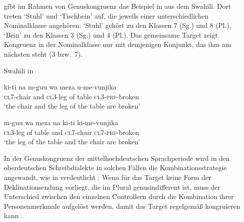 \citet[169]{corbett2006} gibt im Rahmen von Genuskongruenz das Beispiel in
 aus dem Swahili. Dort treten  `Stuhl' und
 `Tischbein' auf, die jeweils einer unterschiedlichen
Nominalklasse angehören:  `Stuhl' gehört zu den Klassen 7 (Sg.) und 8
(Pl.),  `Bein' zu den Klassen 3 (Sg.) und 4 (Pl.). Das gemeinsame
Target  zeigt Kongruenz in der Nominalklasse nur mit
demjenigen Konjunkt, das ihm am nächsten steht (3 bzw.~7).

\begin{exe}
\ex \label{ex:cca}
	\langinfo%
		{Swahili}%
		{}%
		{\cite[45]{bokamba1985} in \cite[169]{corbett2006}}
	\begin{xlist}
	\ex \label{ex:cca_1}
		\gll ki-ti na m-guu wa meza u-me-vunjika \\
			\textsc{cl7}-chair and \textsc{cl3}-leg of table
			\textsc{cl3}-\textsc{prf}-broken \\
		\trans `the chair and the leg of the table are broken'

	\ex \label{ex:cca_2}
		\gll m-guu wa meza na ki-ti ki-me-vunjika \\
			\textsc{cl3}-leg of table and \textsc{cl7}-chair
			\textsc{cl7}-\textsc{prf}-broken \\
		\trans `the leg of the table and the chair are broken'
	\end{xlist}
\end{exe}

In der Genuskongruenz der mittelhochdeutschen
Sprachperiode wird in den oberdeutschen Schreibdialekte in
solchen Fällen die Kombinationsstrategie angewandt, wie in
 verdeutlicht
\autocites[vgl.][312]{grimm1890}[329]{grimm1898}[39--41]{behaghel1928}[187--189]{dal2014}:
Wenn für das Target keine Form der Deklinationsendung vorliegt, die im Plural
genusindifferent ist, muss der Unterschied zwischen den einzelnen Controllern
durch die Kombination ihrer Personenmerkmale aufgelöst werden, damit das Target
regelgemäß kongruieren kann
\autocites[vgl.][182--193]{corbett1983}[269--306]{corbett1991}[243--263]{corbett2006}.

